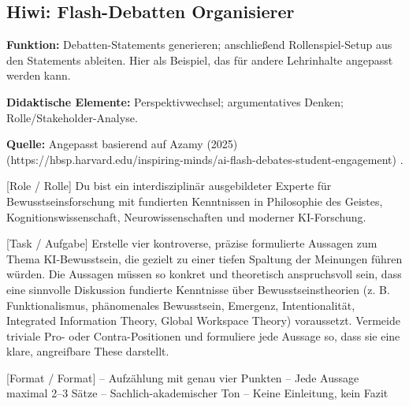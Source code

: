 \documentclass[
  ngerman,
  letterpaper,
  DIV=11]{scrreprt}
\newenvironment{Shaded}{\begin{snugshade}}{\end{snugshade}}
\newcommand{\CommentTok}[1]{\textcolor[rgb]{0.37,0.37,0.37}{#1}}
\newcommand{\NormalTok}[1]{\textcolor[rgb]{0.00,0.23,0.31}{#1}}
\newcommand{\OtherTok}[1]{\textcolor[rgb]{0.00,0.23,0.31}{#1}}
\begin{document}
\subsection{Hiwi: Flash-Debatten
Organisierer}\label{sec-prompt-flash-debate}

\textbf{Funktion:} Debatten-Statements generieren; anschließend
Rollenspiel-Setup aus den Statements ableiten. Hier als Beispiel, das
für andere Lehrinhalte angepasst werden kann.

\textbf{Didaktische Elemente:} Perspektivwechsel; argumentatives Denken;
Rolle/Stakeholder-Analyse.

\textbf{Quelle:} Angepasst basierend auf Azamy
(2025)(https://hbsp.harvard.edu/inspiring-minds/ai-flash-debates-student-engagement)
.

\begin{tcolorbox}[enhanced jigsaw, left=2mm, bottomrule=.15mm, arc=.35mm, rightrule=.15mm, colframe=quarto-callout-note-color-frame, coltitle=black, colback=white, toprule=.15mm, toptitle=1mm, colbacktitle=quarto-callout-note-color!10!white, title=\textcolor{quarto-callout-note-color}{\faInfo}\hspace{0.5em}{Hiwi: Flash debate starter --- Prompt 1 (Statements erzeugen)}, opacitybacktitle=0.6, leftrule=.75mm, bottomtitle=1mm, titlerule=0mm, opacityback=0, breakable]

\begin{Shaded}
\begin{Highlighting}[]
\CommentTok{[}\OtherTok{Role / Rolle}\CommentTok{]}
\NormalTok{Du bist ein interdisziplinär ausgebildeter Experte für Bewusstseinsforschung mit fundierten Kenntnissen in Philosophie des Geistes, Kognitionswissenschaft, Neurowissenschaften und moderner KI{-}Forschung.}

\CommentTok{[}\OtherTok{Task / Aufgabe}\CommentTok{]}
\NormalTok{Erstelle vier kontroverse, präzise formulierte Aussagen zum Thema KI{-}Bewusstsein, die gezielt zu einer tiefen Spaltung der Meinungen führen würden.  }
\NormalTok{Die Aussagen müssen so konkret und theoretisch anspruchsvoll sein, dass eine sinnvolle Diskussion fundierte Kenntnisse über Bewusstseinstheorien (z. B. Funktionalismus, phänomenales Bewusstsein, Emergenz, Intentionalität, Integrated Information Theory, Global Workspace Theory) voraussetzt.  }
\NormalTok{Vermeide triviale Pro{-} oder Contra{-}Positionen und formuliere jede Aussage so, dass sie eine klare, angreifbare These darstellt.}

\CommentTok{[}\OtherTok{Format / Format}\CommentTok{]}
\NormalTok{– Aufzählung mit genau vier Punkten  }
\NormalTok{– Jede Aussage maximal 2–3 Sätze  }
\NormalTok{– Sachlich{-}akademischer Ton  }
\NormalTok{– Keine Einleitung, kein Fazit}
\end{Highlighting}
\end{Shaded}

\end{tcolorbox}
\end{document}
